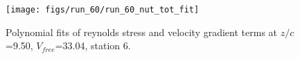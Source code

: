 \begin{figure}[H]
\centering
\texttt{[image: figs/run\_60/run\_60\_nut\_tot\_fit]}
\caption{Polynomial fits of reynolds stress and velocity gradient terms at $z/c$=9.50, $V_{free}$=33.04, station 6.}
\label{fig:run_60_nut_tot_fit}
\end{figure}


